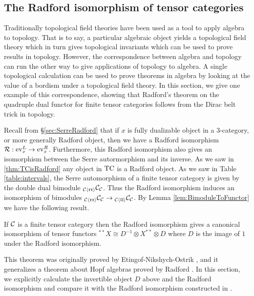 \documentclass{amsart}
\begin{document}
\subsection{The Radford isomorphism of tensor categories} \label{sec:radiso} 

Traditionally topological field theories have been used as a tool to apply algebra to topology.  That is to say, a particular algebraic object yields a topological field theory which in turn gives topological invariants which can be used to prove results in topology.  However, the correspondence between algebra and topology can run the other way to give applications of topology to algebra.  A single topological calculation can be used to prove theorems in algebra by looking at the value of a bordism under a topological field theory.  In this section, we give one example of this correspondence, showing that Radford's theorem on the quadruple dual functor for finite tensor categories follows from the Dirac belt trick in topology.

Recall from \S \ref{sec:SerreRadford} that if $x$ is fully dualizable object in a $3$-category, or more generally Radford object, then we have a Radford isomorphism $\mathcal R: \mathrm{ev}_x^L \rightarrow \mathrm{ev}_x^R$.  Furthermore, this Radford isomorphism also gives an isomorphism between the Serre autormorphism and its inverse.  As we saw in \ref{thm:TCisRadford} any object in $\mathrm{TC}$ is a Radford object.  As we saw in Table \ref{table:intervals}, the Serre automorphism of a finite tensor category is given by the double dual bimodule ${}_{\mathcal C \langle \mathfrak{r r} \rangle}\mathcal C_{\mathcal C}$.  Thus the Radford isomorphism induces an isomorphism of bimodules ${}_{\mathcal C \langle \mathfrak{r r} \rangle} \mathcal C_{\mathcal C} \rightarrow {}_{\mathcal C \langle \mathfrak{l l} \rangle} \mathcal C_{\mathcal C}$.  By Lemma \ref{lem:BimoduleToFunctor} we have the following result.

\begin{theorem}
If $\mathcal C$ is a finite tensor category then the Radford isomorphism gives a canonical isomorphism of tensor functors ${}^{**}X \cong D^{-1} \otimes X^{**} \otimes D$ where $D$ is the image of $1$ under the Radford isomorphism.
\end{theorem}

This theorem was originally proved by Etingof-Nikshych-Ostrik \cite{MR2097289}, and it generalizes a theorem about Hopf algebras proved by Radford \cite{MR0407069}.  In this section, we explicitly calculate the invertible object $D$ above and the Radford isomorphism and compare it with the Radford isomorphism constructed in \cite{MR2097289}.
\end{document}
